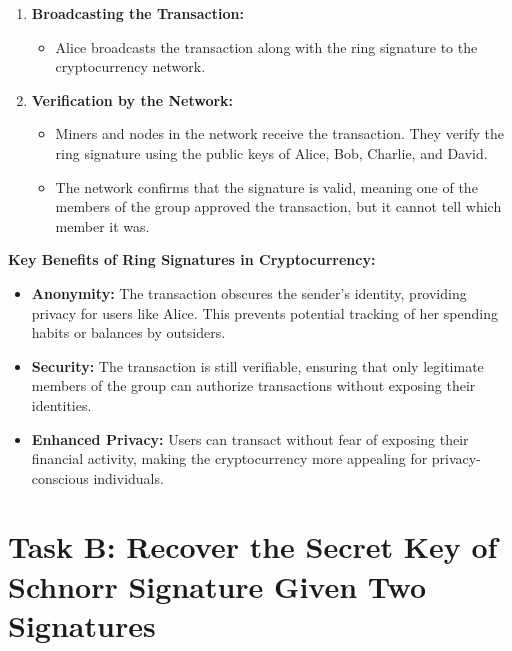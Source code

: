 \documentclass[12pt]{article}
\begin{document}
\begin{enumerate}
    \item \textbf{Broadcasting the Transaction:}
    \begin{itemize}
        \item Alice broadcasts the transaction along with the ring signature to the cryptocurrency network.
    \end{itemize}

    \item \textbf{Verification by the Network:}
    \begin{itemize}
        \item Miners and nodes in the network receive the transaction. They verify the ring signature using the public keys of Alice, Bob, Charlie, and David.
        \item The network confirms that the signature is valid, meaning one of the members of the group approved the transaction, but it cannot tell which member it was.
    \end{itemize}
\end{enumerate}

\textbf{Key Benefits of Ring Signatures in Cryptocurrency:}
\begin{itemize}
    \item \textbf{Anonymity:} The transaction obscures the sender’s identity, providing privacy for users like Alice. This prevents potential tracking of her spending habits or balances by outsiders.
    \item \textbf{Security:} The transaction is still verifiable, ensuring that only legitimate members of the group can authorize transactions without exposing their identities.
    \item \textbf{Enhanced Privacy:} Users can transact without fear of exposing their financial activity, making the cryptocurrency more appealing for privacy-conscious individuals.
\end{itemize}

\section{Task B: Recover the Secret Key of Schnorr Signature Given Two Signatures}

\end{document}
